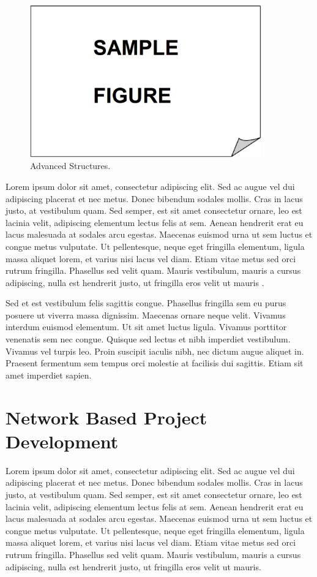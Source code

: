 \begin{figure}
 \centering
 \includegraphics[width=10cm,keepaspectratio=true]{./fig/sekil2}
 \vspace*{4mm}
 \caption{Advanced Structures.}
 \label{fig:ch2-1}
\end{figure}

Lorem ipsum dolor sit amet, consectetur adipiscing elit. Sed ac augue vel dui 
adipiscing placerat et nec metus. Donec bibendum sodales mollis. Cras in lacus 
justo, at vestibulum quam. Sed semper, est sit amet consectetur ornare, leo est 
lacinia velit, adipiscing elementum lectus felis at sem. Aenean hendrerit erat eu 
lacus malesuada at sodales arcu egestas. Maecenas euismod urna ut sem luctus et 
congue metus vulputate. Ut pellentesque, neque eget fringilla elementum, ligula 
massa aliquet lorem, et varius nisi lacus vel diam. Etiam vitae metus sed orci 
rutrum fringilla. Phasellus sed velit quam. Mauris vestibulum, mauris a cursus 
adipiscing, nulla est hendrerit justo, ut fringilla eros velit ut mauris 
.

Sed et est vestibulum felis sagittis congue. Phasellus fringilla sem eu purus 
posuere ut viverra massa dignissim. Maecenas ornare neque velit. Vivamus interdum 
euismod elementum. Ut sit amet luctus ligula. Vivamus porttitor venenatis sem nec 
congue. Quisque sed lectus et nibh imperdiet vestibulum. Vivamus vel turpis leo. 
Proin suscipit iaculis nibh, nec dictum augue aliquet in. Praesent fermentum sem 
tempus orci molestie at facilisis dui sagittis. Etiam sit amet imperdiet sapien. 

\newpage
\section{Network Based Project Development}

Lorem ipsum dolor sit amet, consectetur adipiscing elit. Sed ac augue vel dui 
adipiscing placerat et nec metus. Donec bibendum sodales mollis. Cras in lacus 
justo, at vestibulum quam. Sed semper, est sit amet consectetur ornare, leo est 
lacinia velit, adipiscing elementum lectus felis at sem. Aenean hendrerit erat eu 
lacus malesuada at sodales arcu egestas. Maecenas euismod urna ut sem luctus et 
congue metus vulputate. Ut pellentesque, neque eget fringilla elementum, ligula 
massa aliquet lorem, et varius nisi lacus vel diam. Etiam vitae metus sed orci 
rutrum fringilla. Phasellus sed velit quam. Mauris vestibulum, mauris a cursus 
adipiscing, nulla est hendrerit justo, ut fringilla eros velit ut mauris.


